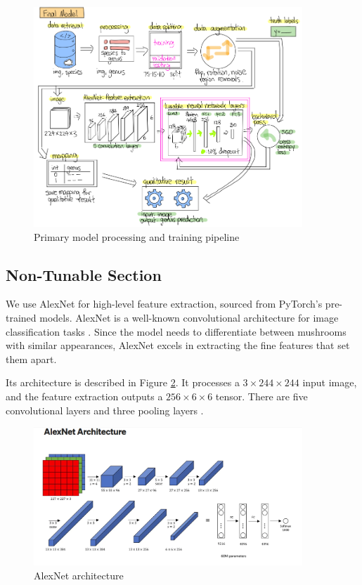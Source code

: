 \documentclass{article} %
\begin{document}
\FloatBarrier
\begin{figure}[h]
    \begin{center}
    \includegraphics[width=0.9\textwidth]{figures/modelArchitecture_drawing.png}
    \end{center}
    \caption{Primary model processing and training pipeline}
    \label{fig:pipeline}
\end{figure}
\FloatBarrier

\subsection{Non-Tunable Section}
\label{sec:non_tunable_section}
We use AlexNet for high-level feature extraction, sourced from PyTorch's pre-trained models. AlexNet is a well-known convolutional architecture for image classification tasks \citep{NIPS2012_c399862d}. Since the model needs to differentiate between mushrooms with similar appearances, AlexNet excels in extracting the fine features that set them apart.

Its architecture is described in Figure \ref{fig:alexnet}. It processes a $3\times 244\times 244$ input image, and the feature extraction outputs a $256\times 6\times 6$ tensor. There are five convolutional layers and three pooling layers \citep{NIPS2012_c399862d}.

\FloatBarrier
\begin{figure}[h]
    \begin{center}
    \includegraphics[width=0.9\textwidth]{figures/AlexNetStructure.png}
    \end{center}
    \caption{AlexNet architecture}
    \label{fig:alexnet}
\end{figure}
\FloatBarrier
\end{document}
